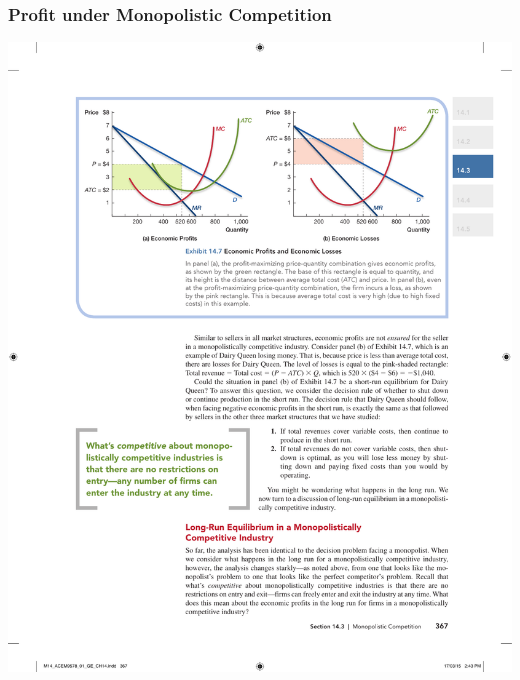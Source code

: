 \documentclass[12pt, xcolor=dvipsnames]{beamer}
\begin{document}
\begin{frame}
\frametitle{\bf Profit under Monopolistic Competition}
\begin{center}
\includegraphics[width=\linewidth]{figures/14-7.pdf}
\end{center}
\end{frame}
\end{document}
